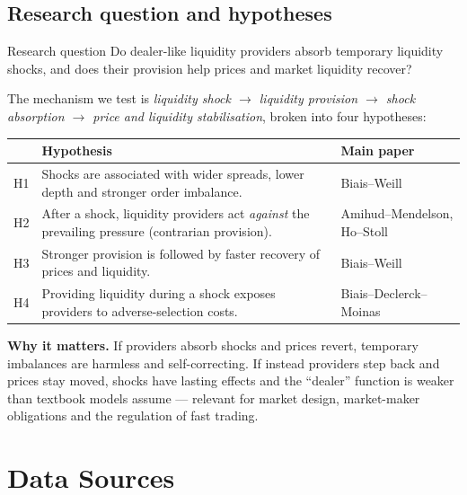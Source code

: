 \documentclass[11pt,a4paper]{article}
\begin{document}
\subsection{Research question and hypotheses}
\begin{keybox}{Research question}
Do dealer-like liquidity providers absorb temporary liquidity shocks, and does their provision help prices
and market liquidity recover?
\end{keybox}

\noindent The mechanism we test is
\emph{liquidity shock $\rightarrow$ liquidity provision $\rightarrow$ shock absorption $\rightarrow$ price
and liquidity stabilisation}, broken into four hypotheses:

\begin{center}
\begin{tabularx}{\linewidth}{@{}l X l@{}}
\toprule
& \textbf{Hypothesis} & \textbf{Main paper} \\
\midrule
H1 & Shocks are associated with wider spreads, lower depth and stronger order imbalance. & Biais--Weill \\
H2 & After a shock, liquidity providers act \emph{against} the prevailing pressure (contrarian provision). & Amihud--Mendelson, Ho--Stoll \\
H3 & Stronger provision is followed by faster recovery of prices and liquidity. & Biais--Weill \\
H4 & Providing liquidity during a shock exposes providers to adverse-selection costs. & Biais--Declerck--Moinas \\
\bottomrule
\end{tabularx}
\end{center}

\noindent\textbf{Why it matters.} If providers absorb shocks and prices revert, temporary imbalances are
harmless and self-correcting. If instead providers step back and prices stay moved, shocks have lasting
effects and the ``dealer'' function is weaker than textbook models assume --- relevant for market design,
market-maker obligations and the regulation of fast trading.

\newpage
\section{Data Sources}
\label{sec:data}
\end{document}
